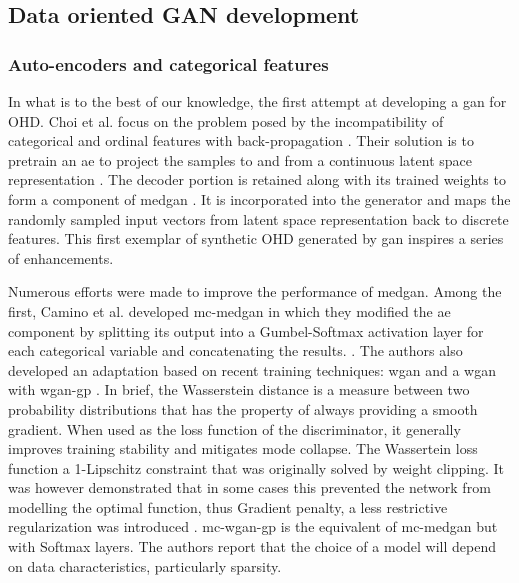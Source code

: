     \subsection{Data oriented GAN development}\label{subsec:data_gan_dev}

        \subsubsection{Auto-encoders and categorical features}\label{subsubsec:categorical}

            In what is to the best of our knowledge, the first attempt at developing a \gls{gan} for OHD. Choi et al. focus on the problem posed by the incompatibility of categorical and ordinal features with back-propagation . Their solution is to pretrain an \gls{ae} to project the samples to and from a continuous latent space representation . The decoder portion is retained along with its trained weights to form a component of \gls{medgan} \cite{Choi2017-nt}. It is incorporated into the generator and maps the randomly sampled input vectors from latent space representation back to discrete features. This first exemplar of synthetic OHD generated by \gls{gan} inspires a series of enhancements.\par

            Numerous efforts were made to improve the performance of \gls{medgan}. Among the first, Camino et al. developed \gls{mc-medgan} in which they modified the \gls{ae} component by splitting its output into a Gumbel-Softmax \cite{jang2016categorical} activation layer for each categorical variable and concatenating the results. \cite{Camino2018-re}. The authors also developed an adaptation based on recent training techniques: \gls{wgan} \cite{arjovsky2017wasserstein} and a \gls{wgan} with \gls{wgan-gp} \cite{gulrajani2017improved}. In brief, the Wasserstein distance is a measure between two probability distributions that has the property of always providing a smooth gradient. When used as the loss function of the discriminator, it generally improves training stability and mitigates mode collapse. The Wassertein loss function a 1-Lipschitz constraint that was originally solved by weight clipping. It was however demonstrated that in some cases this prevented the network from modelling the optimal function, thus Gradient penalty, a less restrictive regularization was introduced \cite{Petzka2018}. \gls{mc-wgan-gp} is the equivalent of \gls{mc-medgan} but with Softmax layers. The authors report that the choice of a model will depend on data characteristics, particularly sparsity.\par
            
